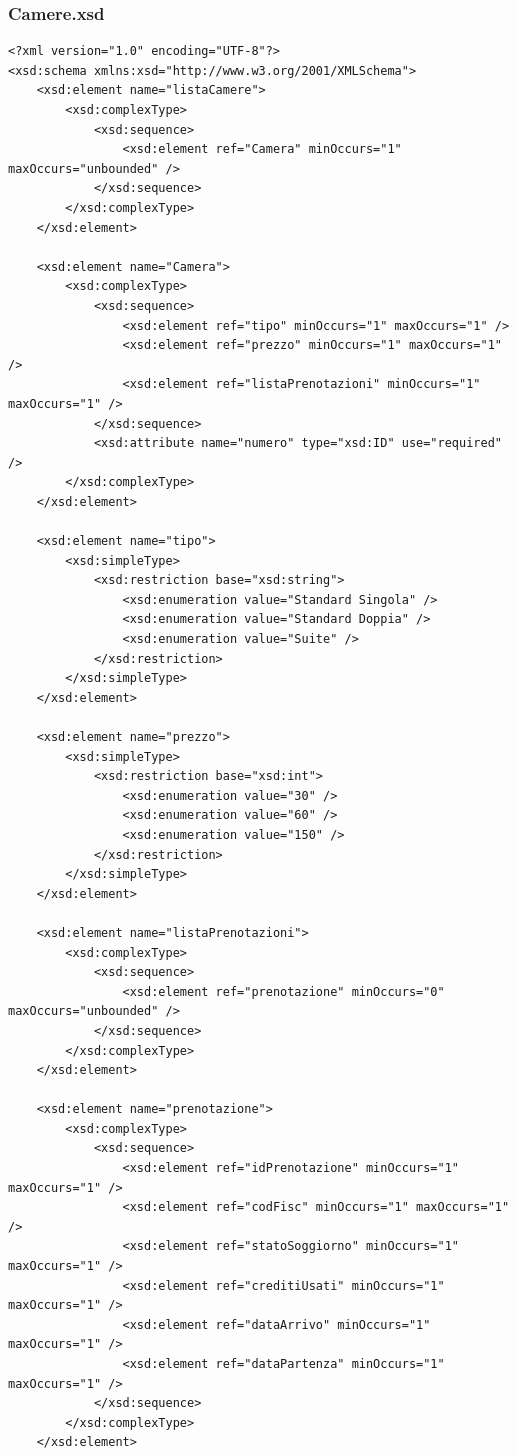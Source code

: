 \documentclass [a4paper, 12pt]{book}
\begin{document}
\subsubsection{Camere.xsd}
\begin{lstlisting}[style=XML]
<?xml version="1.0" encoding="UTF-8"?>
<xsd:schema xmlns:xsd="http://www.w3.org/2001/XMLSchema">
    <xsd:element name="listaCamere">
        <xsd:complexType>
            <xsd:sequence>
                <xsd:element ref="Camera" minOccurs="1" maxOccurs="unbounded" />
            </xsd:sequence>
        </xsd:complexType>
    </xsd:element>

    <xsd:element name="Camera">
        <xsd:complexType>
            <xsd:sequence>
                <xsd:element ref="tipo" minOccurs="1" maxOccurs="1" />
                <xsd:element ref="prezzo" minOccurs="1" maxOccurs="1" />
                <xsd:element ref="listaPrenotazioni" minOccurs="1" maxOccurs="1" />
            </xsd:sequence>
            <xsd:attribute name="numero" type="xsd:ID" use="required" />
        </xsd:complexType>
    </xsd:element>

    <xsd:element name="tipo">
        <xsd:simpleType>
            <xsd:restriction base="xsd:string">
                <xsd:enumeration value="Standard Singola" />
                <xsd:enumeration value="Standard Doppia" />
                <xsd:enumeration value="Suite" />
            </xsd:restriction>
        </xsd:simpleType>
    </xsd:element>

    <xsd:element name="prezzo">
        <xsd:simpleType>
            <xsd:restriction base="xsd:int">
                <xsd:enumeration value="30" />
                <xsd:enumeration value="60" />
                <xsd:enumeration value="150" />
            </xsd:restriction>
        </xsd:simpleType>
    </xsd:element>

    <xsd:element name="listaPrenotazioni">
        <xsd:complexType>
            <xsd:sequence>
                <xsd:element ref="prenotazione" minOccurs="0" maxOccurs="unbounded" />
            </xsd:sequence>
        </xsd:complexType>
    </xsd:element>

    <xsd:element name="prenotazione">
        <xsd:complexType>
            <xsd:sequence>
                <xsd:element ref="idPrenotazione" minOccurs="1" maxOccurs="1" />
                <xsd:element ref="codFisc" minOccurs="1" maxOccurs="1" />
                <xsd:element ref="statoSoggiorno" minOccurs="1" maxOccurs="1" />
                <xsd:element ref="creditiUsati" minOccurs="1" maxOccurs="1" />
                <xsd:element ref="dataArrivo" minOccurs="1" maxOccurs="1" />
                <xsd:element ref="dataPartenza" minOccurs="1" maxOccurs="1" />
            </xsd:sequence>
        </xsd:complexType>
    </xsd:element>


\end{lstlisting}
\end{document}
